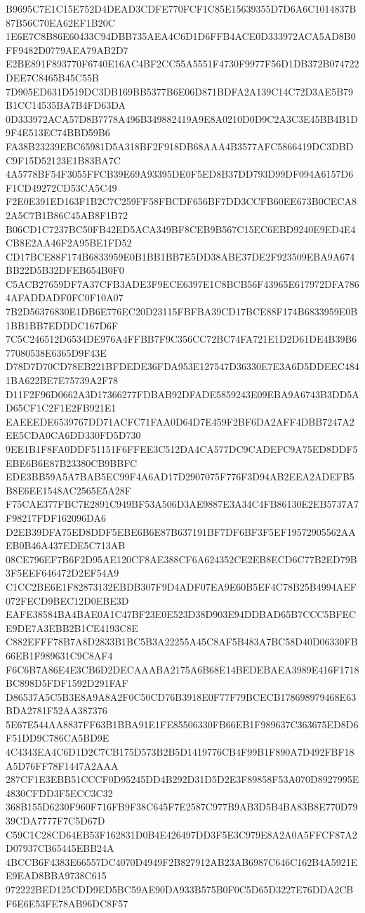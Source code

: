 {{B9695C7E1C15E752D4DEAD3CDFE770FCF1C85E15639355D7D6A6C1014837B87B56C70EA62EF1B20C
1E6E7C8B86E60433C94DBB735AEA4C6D1D6FFB4ACE0D333972ACA5AD8B0FF9482D0779AEA79AB2D7
E2BE891F893770F6740E16AC4BF2CC55A5551F4730F9977F56D1DB372B074722DEE7C8465B45C55B
7D905ED631D519DC3DB169BB5377B6E06D871BDFA2A139C14C72D3AE5B79B1CC14535BA7B4FD63DA
0D333972ACA57D8B7778A496B349882419A9E8A0210D0D9C2A3C3E45BB4B1D9F4E513EC74BBD59B6
FA38B23239EBC65981D5A318BF2F918DB68AAA4B3577AFC5866419DC3DBDC9F15D52123E1B83BA7C
4A5778BF54F3055FFCB39E69A93395DE0F5ED8B37DD793D99DF094A6157D6F1CD49272CD53CA5C49
F2E0E391ED163F1B2C7C259FF58FBCDF656BF7DD3CCFB60EE673B0CECA82A5C7B1B86C45AB8F1B72
B06CD1C7237BC50FB42ED5ACA349BF8CEB9B567C15EC6EBD9240E9ED4E4CB8E2AA46F2A95BE1FD52
CD17BCE88F174B6833959E0B1BB1BB7E5DD38ABE37DE2F923509EBA9A674BB22D5B32DFEB654B0F0
C5ACB27659DF7A37CFB3ADE3F9ECE6397E1C8BCB56F43965E617972DFA7864AFADDADF0FC0F10A07
7B2D56376830E1DB6E776EC20D23115FBFBA39CD17BCE88F174B6833959E0B1BB1BB7EDDDC167D6F
7C5C246512D6534DE976A4FFBB7F9C356CC72BC74FA721E1D2D61DE4B39B677080538E6365D9F43E
D78D7D70CD78EB221BFDEDE36FDA953E127547D36330E7E3A6D5DDEEC4841BA622BE7E75739A2F78
D11F2F96D0662A3D17366277FDBAB92DFADE5859243E09EBA9A6743B3DD5AD65CF1C2F1E2FB921E1
EAEEEDE6539767DD71ACFC71FAA0D64D7E459F2BF6DA2AFF4DBB7247A2EE5CDA0CA6DD330FD5D730
9EE1B1F8FA0DDF51151F6FFEE3C512DA4CA577DC9CADEFC9A75ED8DDF5EBE6B6E87B23380CB9BBFC
EDE3BB59A5A7BAB5EC99F4A6AD17D2907075F776F3D94AB2EEA2ADEFB5B8E6EE1548AC2565E5A28F
F75CAE377FBC7E2891C949BF53A506D3AE9887E3A34C4FB86130E2EB5737A7F98217FDF162096DA6
D2EB39DFA75ED8DDF5EBE6B6E87B637191BF7DF6BF3F5EF19572905562AAEB0B46A437EDE5C713AB
08CE796EF7B6F2D95AE120CF8AE388CF6A624352CE2EB8ECD6C77B2ED79B3F5EEF646472D2EF54A9
C1CC2BE6E1F82873132EBDB307F9D4ADF07EA9E60B5EF4C78B25B4994AEF072FECD9BEC12D0EBE3D
EAFE38584BA4BAE0A1C47BF23E0E523D38D903E94DDBAD65B7CCC5BFECE9DE7A3EBB2B1CE4193C8E
C882EFFF78B7A8D2833B1BC5B3A22255A45C8AF5B483A7BC58D40D06330FB66EB1F989631C9C8AF4
F6C6B7A86E4E3CB6D2DECAAABA2175A6B68E14BEDEBAEA3989E416F1718BC898D5FDF1592D291FAF
D86537A5C5B3E8A9A8A2F0C50CD76B3918E0F77F79BCECB178698979468E63BDA2781F52AA387376
5E67E544AA8837FF63B1BBA91E1FE85506330FB66EB1F989637C363675ED8D6F51DD9C786CA5BD9E
4C4343EA4C6D1D2C7CB175D573B2B5D1419776CB4F99B1F890A7D492FBF18A5D76FF78F1447A2AAA
287CF1E3EBB51CCCF0D95245DD4B292D31D5D2E3F89858F53A070D8927995E4830CFDD3F5ECC3C32
368B155D6230F960F716FB9F38C645F7E2587C977B9AB3D5B4BA83B8E770D7939CDA7777F7C5D67D
C59C1C28CD64EB53F162831D0B4E426497DD3F5E3C979E8A2A0A5FFCF87A2D07937CB65445EBB24A
4BCCB6F4383E66557DC4070D4949F2B827912AB23AB6987C646C162B4A5921EE9EAD8BBA9738C615
972222BED125CDD9ED5BC59AE90DA933B575B0F0C5D65D3227E76DDA2CBF6E6E53FE78AB96DC8F57
}}

